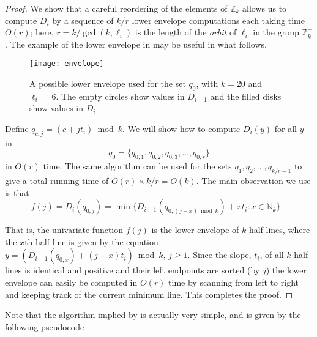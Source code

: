 \documentclass[11pt]{patmorin}
\newcommand{\Z}{\mathbb{Z}}
\newcommand{\N}{\mathbb{N}}
\newcommand{\defeq}{=}
\begin{document}
\begin{proof}
We show that a careful reordering of the elements of $\Z_k$ allows us
to compute $D_i$ by a sequence of $k/r$ lower envelope computations
each taking time $O(r)$; here, $r=k/\gcd(k,\ell_i)$ is the length of
the \emph{orbit} of $\ell_i$ in the group $\mathbb{Z}_k^+$.  The
example of 
the lower envelope in
 may be useful in what follows.

\begin{figure}
\begin{center}
\texttt{[image: envelope]}
\end{center}
\caption{A possible lower envelope used for the set $q_{0}$, with $k=20$
and $\ell_i=6$.   The empty circles show values in $D_{i-1}$ and
the filled disks show values in $D_i$.}
\end{figure}

Define $q_{c,j} = (c + jt_i)\bmod k$.  We will show how to compute
$D_{i}(y)$ for all $y$ in 
\[ 
    q_{0}=\{q_{0,1}, q_{0,2},q_{0,3},\ldots,q_{0,r}\}
\]
in $O(r)$ time.  The same algorithm can be used for the sets $q_{1},
q_{2}, \ldots, q_{k/r-1}$ to give a total running time of
$O(r)\times k/r= O(k)$.
The main observation we use is that
\begin{equation}
    f(j) \defeq D_{i}(q_{0,j}) = \min\{D_{i-1}(q_{0,(j-x)\bmod k})+xt_i :
x\in \N_k\} \enspace .
\end{equation}

That is, the univariate function $f(j)$ is the lower
envelope of $k$ half-lines, where the $x$th half-line is given by the
equation $y=(D_{i-1}(q_{0,x}) + (j-x)t_i)\bmod k$, $j\ge 1$.  Since
the slope, $t_i$, of all $k$ half-lines is identical and positive and
their left endpoints are sorted (by $j$) the lower envelope can easily
be computed in $O(r)$ time by scanning from left to right and keeping
track of the current minimum line.  This completes the proof.
\end{proof}

Note that the algorithm implied by  is actually very
simple, and is given by the following pseudocode

\begin{algorithmic}[1]
  \ENDFOR
  \ENDFOR
\ENDFOR
\end{algorithmic}
\end{document}
